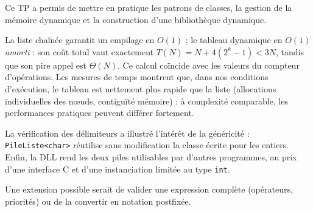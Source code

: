 \documentclass[11pt,a4paper]{article}
\begin{document}
Ce TP a permis de mettre en pratique les patrons de classes, la gestion de la mémoire dynamique et la construction d'une bibliothèque dynamique.

La liste chaînée garantit un empilage en $O(1)$ ; le tableau dynamique en $O(1)$ \emph{amorti} : son coût total vaut exactement $T(N)=N+4(2^k-1)<3N$, tandis que son pire appel est $\Theta(N)$. Ce calcul coïncide avec les valeurs du compteur d'opérations. Les mesures de temps montrent que, dans nos conditions d'exécution, le tableau est nettement plus rapide que la liste (allocations individuelles des nœuds, contiguïté mémoire) : à complexité comparable, les performances pratiques peuvent différer fortement.

La vérification des délimiteurs a illustré l'intérêt de la généricité : \texttt{PileListe<char>} réutilise sans modification la classe écrite pour les entiers. Enfin, la DLL rend les deux piles utilisables par d'autres programmes, au prix d'une interface C et d'une instanciation limitée au type \texttt{int}.

Une extension possible serait de valider une expression complète (opérateurs, priorités) ou de la convertir en notation postfixée.

\end{document}

